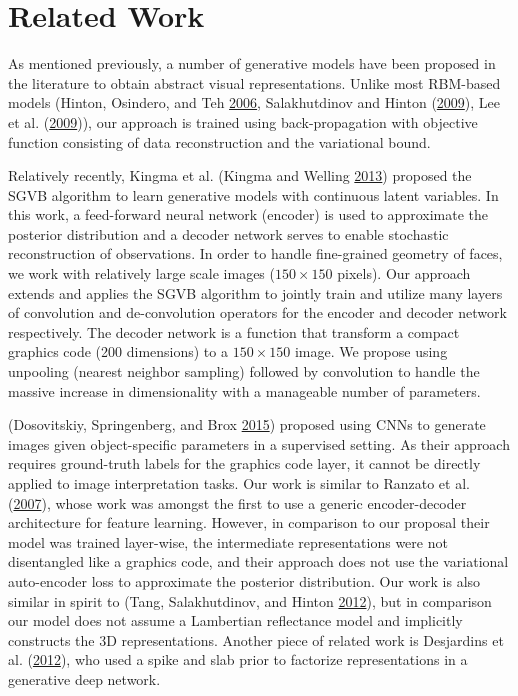 \documentclass[12pt,twoside]{mitthesis}
\begin{document}
\section{Related Work}\label{related-work}

As mentioned previously, a number of generative models have been
proposed in the literature to obtain abstract visual representations.
Unlike most RBM-based models (Hinton, Osindero, and Teh
\protect\hyperlink{ref-hinton2006fast}{2006}, Salakhutdinov and Hinton
(\protect\hyperlink{ref-salakhutdinov2009deep}{2009}), Lee et al.
(\protect\hyperlink{ref-lee2009convolutional}{2009})), our approach is
trained using back-propagation with objective function consisting of
data reconstruction and the variational bound.

Relatively recently, Kingma et al. (Kingma and Welling
\protect\hyperlink{ref-kingma2013auto}{2013}) proposed the SGVB
algorithm to learn generative models with continuous latent variables.
In this work, a feed-forward neural network (encoder) is used to
approximate the posterior distribution and a decoder network serves to
enable stochastic reconstruction of observations. In order to handle
fine-grained geometry of faces, we work with relatively large scale
images ($150 \times 150$ pixels). Our approach extends and applies the
SGVB algorithm to jointly train and utilize many layers of convolution
and de-convolution operators for the encoder and decoder network
respectively. The decoder network is a function that transform a compact
graphics code (200 dimensions) to a $150 \times 150$ image. We propose
using unpooling (nearest neighbor sampling) followed by convolution to
handle the massive increase in dimensionality with a manageable number
of parameters.

(Dosovitskiy, Springenberg, and Brox
\protect\hyperlink{ref-dosovitskiy2015learning}{2015}) proposed using
CNNs to generate images given object-specific parameters in a supervised
setting. As their approach requires ground-truth labels for the graphics
code layer, it cannot be directly applied to image interpretation tasks.
Our work is similar to Ranzato et al.
(\protect\hyperlink{ref-ranzato2007unsupervised}{2007}), whose work was
amongst the first to use a generic encoder-decoder architecture for
feature learning. However, in comparison to our proposal their model was
trained layer-wise, the intermediate representations were not
disentangled like a graphics code, and their approach does not use the
variational auto-encoder loss to approximate the posterior distribution.
Our work is also similar in spirit to (Tang, Salakhutdinov, and Hinton
\protect\hyperlink{ref-tang2012deep}{2012}), but in comparison our model
does not assume a Lambertian reflectance model and implicitly constructs
the 3D representations. Another piece of related work is Desjardins et
al. (\protect\hyperlink{ref-desjardins2012disentangling}{2012}), who
used a spike and slab prior to factorize representations in a generative
deep network.
\end{document}

